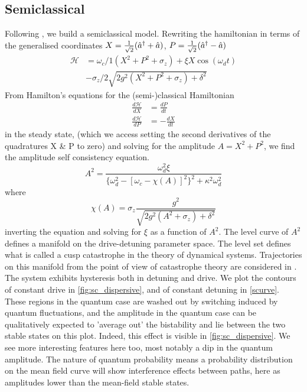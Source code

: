 \subsection{Semiclassical}
Following \cite{Bishop2010}, we build a semiclassical model.
Rewriting the hamiltonian in terms of the generalised coordinates $X = \frac{1}{\sqrt{2}}({\hat{a}^\dagger} + \hat{a})$, $P = \frac{1}{\sqrt{2}}({\hat{a}^\dagger}-\hat{a})$
\begin{align}
        \mathscr{H} &= \omega_c/1 (X^2 + P^2 + \sigma_z) + \xi X \cos(\omega_d t)\nonumber\\
                    & - \sigma_z /2 \sqrt{2g^2(X^2+P^2+\sigma_z) + \delta^2}
\end{align}
From Hamilton's equations for the (semi-)classical Hamiltonian
\begin{align}
        \frac{d\mathscr{H}}{dX} &= \frac{dP}{dt}\\
        \frac{d\mathscr{H}}{dP} &= -\frac{dX}{dt}
\end{align}
in the steady state, (which we access setting the second derivatives of the quadratures X \& P to zero) and solving for the amplitude $A = X^2 + P^2$, we find the amplitude self consistency equation.
\begin{equation}
        A^2 = \frac{\omega_d^2\xi}{\{\omega_d^2 - [\omega_c - \chi (A) ]^2 \}^2+ \kappa^2 \omega_d^2}
\end{equation}
where
\begin{equation}
        \chi(A) = \sigma_z \frac{g^2}{\sqrt{2g^2(A^2 + \sigma_z) + \delta^2}}
        \label{eq:sc_dispersive}
\end{equation}
inverting the equation and solving for $\xi$ as a function of $A^2$. 
The level curve of $A^2$ defines a manifold on the drive-detuning parameter space. 
The level set defines what is called a cusp catastrophe in the theory of dynamical systems.
Trajectories on this manifold from the point of view of catastrophe theory are considered in \cite{Agrawal1979} .  
The system exhibits hysteresis both in detuning and drive. 
We plot the contours of constant drive in \cref{fig:sc_dispersive}, and of constant detuning in \cref{scurve}.
These regions in the quantum case are washed out by switching induced by quantum fluctuations, and the amplitude in the quantum case can be qualitatively expected to 'average out' the bistability and lie between the two stable states on this plot.
Indeed, this effect is visible in \cref{fig:sc_dispersive}.
We see more interesting features here too, most notably a dip in the quantum amplitude. The nature of quantum probability means a probability distribution on the mean field curve will show interference effects between paths, here as amplitudes lower than the mean-field stable states.
